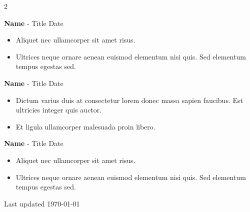 \documentclass[11pt]{article}
\newcommand{\job}[3]{
    \begingroup
        \textbf{\small#1} - \small#2
        \hfill\color{black!70}\small{#3}
    \endgroup
}
\newcommand{\spacevv}{
    \vspace{2mm}
}
\begin{document}
\begin{paracol}{2}
{		\job{Name}{Title}{Date}
		\begin{itemize}
			\item Aliquet nec ullamcorper sit amet risus.
			\item Ultrices neque ornare aenean euismod elementum nisi quis. Sed elementum tempus egestas sed.
		\end{itemize}

		\job{Name}{Title}{Date}
		\begin{itemize}
			\item Dictum varius duis at consectetur lorem donec massa sapien faucibus. Est ultricies integer quis auctor.
			\item Et ligula ullamcorper malesuada proin libero.
		\end{itemize}
		\spacevv

		\job{Name}{Title}{Date}
		\begin{itemize}
			\item Aliquet nec ullamcorper sit amet risus.
			\item Ultrices neque ornare aenean euismod elementum nisi quis. Sed elementum tempus egestas sed.
		\end{itemize}
	}

	\normaltext \hfill \tiny Last updated \today

\end{paracol}
\end{document}
